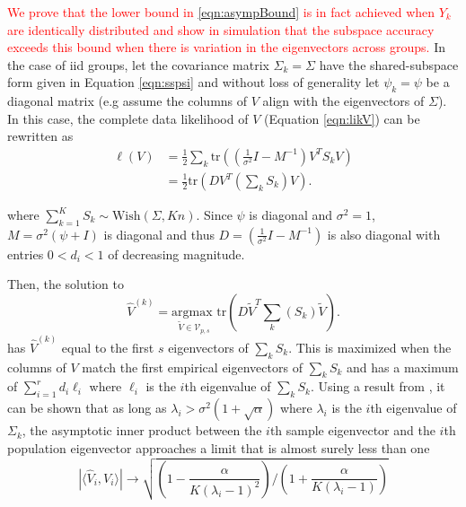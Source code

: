 \documentclass{statsoc}
\newcommand{\tr}{\text{tr}}
\newcommand{\edits}[1]{{\textsf{\textcolor{red}{#1}}}}
\newcommand{\edits}[1]{#1}
\begin{document}
\edits{%
  We prove that the lower bound in \ref{eqn:asympBound} is
in fact achieved when $Y_k$ are identically distributed and show in simulation
that the subspace accuracy exceeds this bound when there is variation
in the eigenvectors across groups. }
In the case of iid groups, let the covariance matrix $\Sigma_k=\Sigma$ have the shared-subspace form given in
Equation \ref{eqn:sspsi} and without loss of
generality let $\psi_k = \psi$ be a diagonal matrix (e.g assume
the columns of $V$ align with the eigenvectors of $\Sigma$).  In this
case, the complete data likelihood of $V$ (Equation
\ref{eqn:likV}) can be rewritten as
%
\begin{align*}
\ell(V) &=\frac{1}{2}\sum_k \tr\left((\frac{1}{\sigma^2}I-M^{-1})V^T
  S_kV\right)\\
&=\frac{1}{2}\tr\left(DV^T(\sum_k S_k)V\right).
\end{align*}
%

\noindent where $\sum_{k=1}^K S_k \sim \text{Wish}(\Sigma, Kn)$.
Since $\psi$ is diagonal and $\sigma^2=1$, 
$M = \sigma^2(\psi + I)$ is diagonal and thus
$D = (\frac{1}{\sigma^2}I-M^{-1})$ is also diagonal with entries
$0 < d_i < 1$ of decreasing magnitude.  

Then, the solution to
$$\hat{V}^{(k)} = \underset{\widetilde{V} \in \mathcal{V}_{p,
    s}}{\text{argmax }} \tr\left(D\widetilde{V}^T
 \sum_k( S_k)\widetilde{V}\right).$$
has $\hat{V}^{(k)}$ equal to the first $s$ eigenvectors of $\sum_k S_k$.  This is
maximized when the columns of $V$ match the first empirical eigenvectors of
$\sum_k S_k$ and has a maximum of $\sum_{i=1}^r d_i\ell_i$ where $\ell_i$ is the
$i$th eigenvalue of $\sum_k S_k$.  Using a result from
\citet{Paul2007}, it can be shown that as long as
$\lambda_i > \sigma^2(1 + \sqrt{\alpha})$ where $\lambda_i$ is the $i$th
eigenvalue of $\Sigma_k$, the asymptotic inner product between
the $i$th sample eigenvector and the $i$th population eigenvector
approaches a limit that is almost surely less than one
$$|\langle\hat{V}_i, V_i\rangle| \to \sqrt{\left(1-\frac{\alpha}{K(\lambda_i - 1)^2}\right) /\left(1 +
    \frac{\alpha}{K(\lambda_i - 1)}\right)} $$
%
\end{document}
